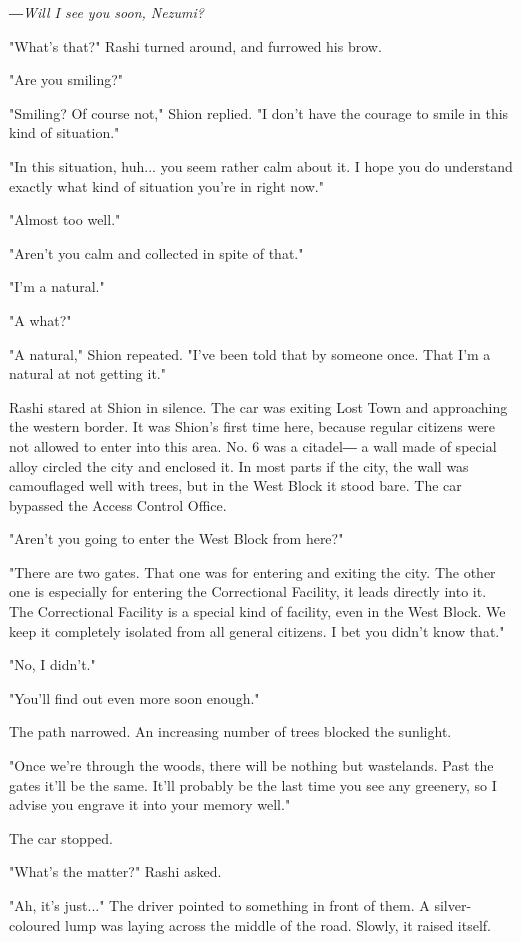 \emph{―Will I see you soon, Nezumi?}

"What's that?" Rashi turned around, and furrowed his brow.

"Are you smiling?"

"Smiling? Of course not," Shion replied. "I don't have the courage to
smile in this kind of situation."

"In this situation, huh... you seem rather calm about it. I hope you do
understand exactly what kind of situation you're in right now."

"Almost too well."

"Aren't you calm and collected in spite of that."

"I'm a natural."

"A what?"

"A natural," Shion repeated. "I've been told that by someone once. That
I'm a natural at not getting it."

Rashi stared at Shion in silence. The car was exiting Lost Town and
approaching the western border. It was Shion's first time here, because
regular citizens were not allowed to enter into this area. No. 6 was a
citadel― a wall made of special alloy circled the city and enclosed it.
In most parts if the city, the wall was camouflaged well with trees, but
in the West Block it stood bare. The car bypassed the Access Control
Office.

"Aren't you going to enter the West Block from here?"

"There are two gates. That one was for entering and exiting the city.
The other one is especially for entering the Correctional Facility, it
leads directly into it. The Correctional Facility is a special kind of
facility, even in the West Block. We keep it completely isolated from
all general citizens. I bet you didn't know that."

"No, I didn't."

"You'll find out even more soon enough."

The path narrowed. An increasing number of trees blocked the sunlight.

"Once we're through the woods, there will be nothing but wastelands.
Past the gates it'll be the same. It'll probably be the last time you
see any greenery, so I advise you engrave it into your memory well."

The car stopped.

"What's the matter?" Rashi asked.

"Ah, it's just..." The driver pointed to something in front of them. A
silver-coloured lump was laying across the middle of the road. Slowly,
it raised itself.

